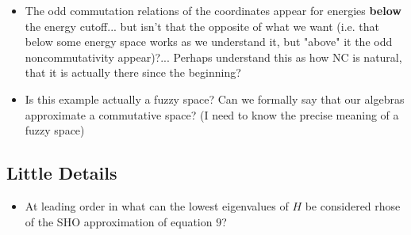     \begin{itemize}
        
    \item The odd commutation relations of the coordinates appear for energies \textbf{below} the energy cutoff... but isn't that the opposite of what we want (i.e. that below some energy space works as we understand it, but "above" it the odd noncommutativity appear)?... Perhaps understand this as how NC is natural, that it is actually there since the beginning?
    
    \item Is this example actually a fuzzy space? Can we formally say that our algebras approximate a commutative space? (I need to know the precise meaning of a fuzzy space)
        
    \end{itemize}


\subsection{Little Details}

    \begin{itemize}
    
    \item At leading order in what can the lowest eigenvalues of $H$ be considered rhose of the SHO approximation of equation $9$?
        
    \end{itemize}